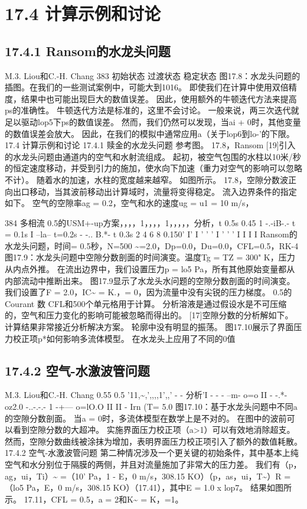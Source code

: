 \documentclass[UTF8,11pt,a4paper,openany,fontset=fandol]{ctexbook}
\begin{document}
\section{17.4 计算示例和讨论}
\subsection{17.4.1 Ransom的水龙头问题}
M.3. Liou和C.-H. Chang 383 初始状态 过渡状态 稳定状态 图17.8：水龙头问题的插图。在我们的一些测试案例中，可能大到1016。 即使我们在计算中使用双倍精度，结果中也可能出现巨大的数值误差。 因此，使用额外的牛顿迭代方法来提高ps的准确性。 牛顿迭代方法是标准的，这里不会讨论。 一般来说，两三次迭代就足以驱动lop5下ps的数值误差。 然而，我们仍然可以发现，当ai + 0时，其他变量的数值误差会放大。 因此，在我们的模拟中通常应用a（关于lop6到lo-'的下限。 17.4 计算示例和讨论 17.4.1 赎金的水龙头问题 参考图。 17.8，Ransom [19]引入的水龙头问题由通道内的空气和水射流组成。 起初，被空气包围的水柱以10米/秒的恒定速度移动，并受到引力的施加，使水向下加速（重力对空气的影响可以忽略不计）。 随着水的加速，水柱的宽度越来越窄。 如图所示。 17.8，空隙分数波正向出口移动，当其波前移动出计算域时，流量将变得稳定。 流入边界条件的指定如下。 空气的空隙率ag = 0.2，空气和水的速度ug = u1 = 10 m/s，

384 多相流 0.5的USM+-up方案，，，，1，，，，1，，，，，分析，t 0.5s 0.45 1 -.-iB-.- t = 0.1s I --la-- t=0.2s - -.. B.*- t 0.3s 2 4 6 8 0.150' I' I ' ' ' I ' ' ' I I I I Ransom的水龙头问题，时间= 0.5秒，N=500 \textasciitilde{}=2.0，Dp=0.0，Du=0.0，CFL=0.5，RK-4图17.9：水龙头问题中空隙分数剖面的时间演变。温度Tg = TZ = 300" K，压力从内点外推。 在流出边界中，我们设置压力p = lo5 Pa，所有其他原始变量都从内部流动中推断出来。 图17.9显示了水龙头水问题的空隙分数剖面的时间演变。 我们设置了F = 2.0，IC\textasciitilde{} = K.，= 0，因为流量中没有尖锐的压力梯度。 0.5的Courant 数 CFL和500个单元格用于计算。 分析溶液是通过假设水是不可压缩的，空气和压力变化的影响可能被忽略而得出的。 [17]空隙分数的分析解如下。 计算结果非常接近分析解决方案。 轮廓中没有明显的振荡。 图17.10展示了界面压力校正项p*如何影响多流体模型。 在水龙头上应用了不同的0值

\subsection{17.4.2 空气-水激波管问题}
M.3. Liou和C.-H. Chang 0.55 0.5 '11,\textasciitilde{},',,,,1',,' - - 分析'I - - - --m- o=o II - -.*- oz2.0 -..-.-.- 1 -+--- o=lO.O II II - Irn (T= 5.0 图17.10：基于水龙头问题中不同a的空隙分数剖面。 当a = 0时，多流体模型在数学上是不对的。 在图中的波前可以看到空隙分数的大超冲。 实施界面压力校正项（a>1）可以有效地消除超支。 然而，空隙分数曲线被涂抹为增加，表明界面压力校正项引入了额外的数值耗散。 17.4.2 空气-水激波管问题 第二种情况涉及一个更关键的初始条件，其中基本上纯空气和水分别位于隔膜的两侧，并且对流量施加了非常大的压力差。 我们有（p，ag，ui，Ti）\textasciitilde{} =（10' Pa，1 - E，0 m/s，308.15 KO）（p，as，ui，T\textasciitilde{}）R =（lo5 Pa，E，0 m/s，308.15 KO）（17.41），其中E = 1.0 x lop7。 结果如图所示。 17.11，CFL = 0.5，a = 2和K\textasciitilde{} = K，=1。
\end{document}
